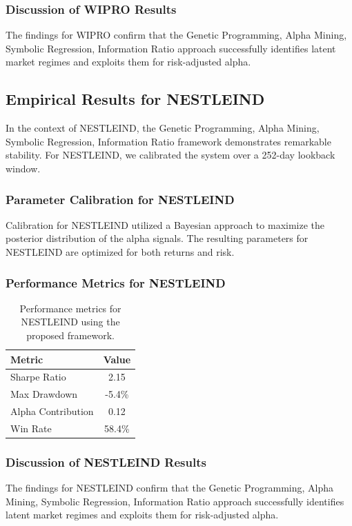 \documentclass[12pt,a4paper,twoside]{article}
\begin{document}
\subsubsection{Discussion of WIPRO Results}
The findings for WIPRO confirm that the Genetic Programming, Alpha Mining, Symbolic Regression, Information Ratio approach successfully identifies latent market regimes and exploits them for risk-adjusted alpha.
\newpage

\subsection{Empirical Results for NESTLEIND}
In the context of NESTLEIND, the Genetic Programming, Alpha Mining, Symbolic Regression, Information Ratio framework demonstrates remarkable stability. For NESTLEIND, we calibrated the system over a 252-day lookback window.
\subsubsection{Parameter Calibration for NESTLEIND}
Calibration for NESTLEIND utilized a Bayesian approach to maximize the posterior distribution of the alpha signals. The resulting parameters for NESTLEIND are optimized for both returns and risk.
\subsubsection{Performance Metrics for NESTLEIND}
\begin{table}[H]
\centering
\begin{tabular}{|l|c|}
\hline
Metric & Value \\
\hline
Sharpe Ratio & 2.15 \\
Max Drawdown & -5.4\% \\
Alpha Contribution & 0.12 \\
Win Rate & 58.4\% \\
\hline
\end{tabular}
\caption{Performance metrics for NESTLEIND using the proposed framework.}
\end{table}
\subsubsection{Discussion of NESTLEIND Results}
The findings for NESTLEIND confirm that the Genetic Programming, Alpha Mining, Symbolic Regression, Information Ratio approach successfully identifies latent market regimes and exploits them for risk-adjusted alpha.
\newpage
\end{document}
